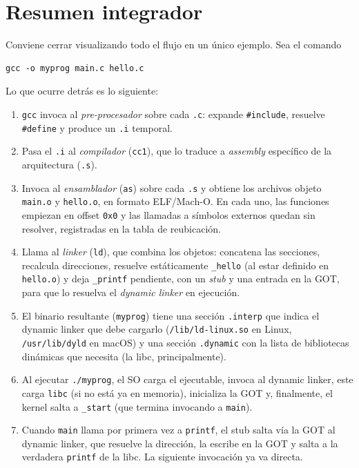 \documentclass[11pt,a4paper]{article}
\begin{document}
\section{Resumen integrador}

Conviene cerrar visualizando todo el flujo en un único ejemplo. Sea el
comando

\begin{lstlisting}
gcc -o myprog main.c hello.c
\end{lstlisting}

Lo que ocurre detrás es lo siguiente:

\begin{enumerate}[leftmargin=*]
    \item \texttt{gcc} invoca al \emph{pre-procesador} sobre cada
        \texttt{.c}: expande \texttt{\#include}, resuelve
        \texttt{\#define} y produce un \texttt{.i} temporal.
    \item Pasa el \texttt{.i} al \emph{compilador} (\texttt{cc1}),
        que lo traduce a \emph{assembly} específico de la
        arquitectura (\texttt{.s}).
    \item Invoca al \emph{ensamblador} (\texttt{as}) sobre cada
        \texttt{.s} y obtiene los archivos objeto \texttt{main.o} y
        \texttt{hello.o}, en formato ELF/Mach-O. En cada uno, las
        funciones empiezan en offset \texttt{0x0} y las llamadas a
        símbolos externos quedan sin resolver, registradas en la
        tabla de reubicación.
    \item Llama al \emph{linker} (\texttt{ld}), que combina los
        objetos: concatena las secciones, recalcula direcciones,
        resuelve estáticamente \texttt{\_hello} (al estar definido
        en \texttt{hello.o}) y deja \texttt{\_printf} pendiente, con
        un \emph{stub} y una entrada en la GOT, para que lo resuelva
        el \emph{dynamic linker} en ejecución.
    \item El binario resultante (\texttt{myprog}) tiene una sección
        \texttt{.interp} que indica el dynamic linker que debe
        cargarlo (\texttt{/lib/ld-linux.so} en Linux,
        \texttt{/usr/lib/dyld} en macOS) y una sección
        \texttt{.dynamic} con la lista de bibliotecas dinámicas que
        necesita (la libc, principalmente).
    \item Al ejecutar \texttt{./myprog}, el SO carga el ejecutable,
        invoca al dynamic linker, este carga \texttt{libc} (si no
        está ya en memoria), inicializa la GOT y, finalmente, el
        kernel salta a \texttt{\_start} (que termina invocando a
        \texttt{main}).
    \item Cuando \texttt{main} llama por primera vez a
        \texttt{printf}, el stub salta vía la GOT al dynamic linker,
        que resuelve la dirección, la escribe en la GOT y salta a la
        verdadera \texttt{printf} de la libc. La siguiente invocación
        ya va directa.
\end{enumerate}
\end{document}
